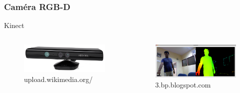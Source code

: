     \begin{frame}
        \frametitle{Caméra RGB-D}
        Kinect \vspace{10 mm}
        \begin{columns}[c]                
            \begin{column}{0.5\textwidth}
                \begin{figure}                 
                    \includegraphics[width=\textwidth]{./media/kinect.png}
                    \caption{upload.wikimedia.org/}
                \end{figure}                        
            \end{column} 
                            
            \begin{column}{0.5\textwidth}
                \begin{figure}                 
                    \includegraphics[width=\textwidth]{./media/kinect_scan.png}
                    \caption{3.bp.blogspot.com}
                \end{figure}
            \end{column}            
        \end{columns}              
    \end{frame}